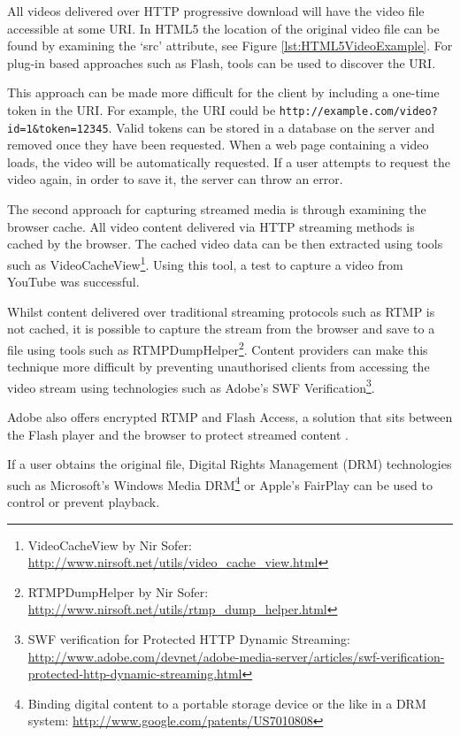 \documentclass[journal]{IEEEtran}
\begin{document}
All videos delivered over HTTP progressive download will have the video file accessible at some URI. In HTML5 the location of the original video file can be found by examining the `src' attribute, see Figure \ref{lst:HTML5VideoExample}. For plug-in based approaches such as Flash, tools can be used to discover the URI.

This approach can be made more difficult for the client by including a one-time token in the URI. For example, the URI could be \texttt{http://example.com/video?id=1\&token=12345}. Valid tokens can be stored in a database on the server and removed once they have been requested. When a web page containing a video loads, the video will be automatically requested. If a user attempts to request the video again, in order to save it, the server can throw an error.

The second approach for capturing streamed media is through examining the browser cache. All video content delivered via HTTP streaming methods is cached by the browser. The cached video data can be then extracted using tools such as VideoCacheView\footnote{VideoCacheView by Nir Sofer: \url{http://www.nirsoft.net/utils/video_cache_view.html}}. Using this tool, a test to capture a video from YouTube was successful.

Whilst content delivered over traditional streaming protocols such as RTMP is not cached, it is possible to capture the stream from the browser and save to a file using tools such as RTMPDumpHelper\footnote{RTMPDumpHelper by Nir Sofer: \url{http://www.nirsoft.net/utils/rtmp_dump_helper.html}}. Content providers can make this technique more difficult by preventing unauthorised clients from accessing the video stream using technologies such as Adobe's SWF Verification\footnote{SWF verification for Protected HTTP Dynamic Streaming: \url{http://www.adobe.com/devnet/adobe-media-server/articles/swf-verification-protected-http-dynamic-streaming.html}}. 

Adobe also offers encrypted RTMP and Flash Access, a solution that sits between the Flash player and the browser to protect streamed content \cite{whitePaper:flashAccess}.

If a user obtains the original file, Digital Rights Management (DRM) technologies such as Microsoft's Windows Media DRM\footnote{Binding digital content to a portable storage device or the like in a DRM system: \url{http://www.google.com/patents/US7010808}} or Apple's FairPlay can be used to control or prevent playback.
\end{document}
